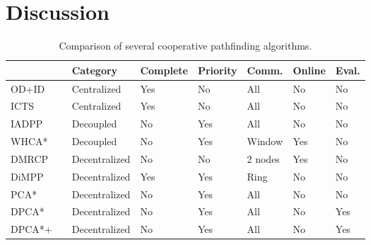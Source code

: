 \section{Discussion}\label{sec:discussion}
\begin{table*}[h]
    \centering
    \caption{Comparison of several cooperative pathfinding algorithms.}
    \label{tbl:planning-overview}
    \begin{tabular}{ll|l|l|l|l|l|l}
        & & Category & Complete & Priority & Comm. & Online & Eval. \\
        \hline
        OD+ID & \cite{standley2010,standley2011} & Centralized & Yes & No &
        All &
        No & No \\
        ICTS & \cite{sharon2013} & Centralized & Yes & No & All & No & No\\
        IADPP & \cite{cap2012} & Decoupled & No & Yes & All & No & No \\
        WHCA* & \cite{silver2005} & Decoupled & No & Yes & Window & Yes & No \\
        DMRCP & \cite{wei2016} & Decentralized & No & No & 2 nodes & Yes & No
        \\
        DiMPP & \cite{chouhan2017} & Decentralized & Yes & Yes & Ring & No & 
        No
        \\ \hline
        PCA* & & Decentralized & No & Yes & All & No & No \\
        DPCA* & & Decentralized & No & Yes & All & No & Yes \\
        DPCA*+ & & Decentralized & No & Yes & All & No & Yes
    \end{tabular}
\end{table*}




